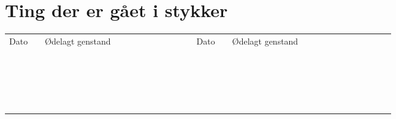 \documentclass[../../main.tex]{subfiles}
\begin{document}
\newpage
\section{Ting der er gået i stykker}
\begin{table}[H]
\centering
\begin{tabular}{|l|l|l|l|l}
\cline{1-4}
Dato~~ & Ødelagt genstand~~~~~~~~~~~~~~~~~~ & Dato~~ & Ødelagt genstand ~~~~~~~~~~~~~~~~~~ &  \\ \cline{1-4}
     &                  &      &                  &  \\ \cline{1-4}
     &                  &      &                  &  \\ \cline{1-4}
     &                  &      &                  &  \\ \cline{1-4}
     &                  &      &                  &  \\ \cline{1-4}
     &                  &      &                  &  \\ \cline{1-4}
     &                  &      &                  &  \\ \cline{1-4}
     &                  &      &                  &  \\ \cline{1-4}
     &                  &      &                  &  \\ \cline{1-4}
     &                  &      &                  &  \\ \cline{1-4} 
     &                  &      &                  &  \\ \cline{1-4}
     &                  &      &                  &  \\ \cline{1-4}
     &                  &      &                  &  \\ \cline{1-4}
     &                  &      &                  &  \\ \cline{1-4}
     &                  &      &                  &  \\ \cline{1-4}
     &                  &      &                  &  \\ \cline{1-4}
     &                  &      &                  &  \\ \cline{1-4}
     &                  &      &                  &  \\ \cline{1-4}
     &                  &      &                  &  \\ \cline{1-4} 
     &                  &      &                  &  \\ \cline{1-4}
     &                  &      &                  &  \\ \cline{1-4}

\end{tabular}
\end{table}
\end{document}
